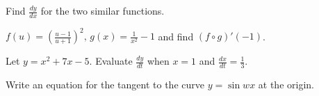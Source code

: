 \documentclass[addpoints, 12pt]{exam}
\begin{document}
\begin{questions}
    
    \newpage
    
    \question Find $\displaystyle\frac{dy}{dx}$ for the two similar functions.
    
    
    \question $\displaystyle f(u)=\left(\frac{u-1}{u+1}\right)^2,\, g(x)=\frac{1}{x^2}-1$ and find $(f\circ g)'(-1)$.
    
    
    \question Let $y=x^2+7x-5.$ Evaluate $\displaystyle\frac{dy}{dt}$ when $x=1$ and $\displaystyle\frac{dx}{dt}=\frac{1}{3}$.
    
    
    \question Write an equation for the tangent to the curve $y=\sin wx$ at the origin.
    
    
\end{questions}
\end{document}
